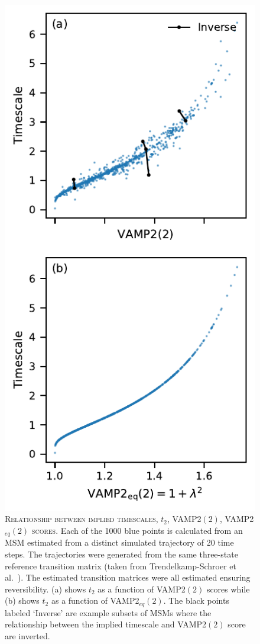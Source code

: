 \documentclass[journal=jacsat,manuscript=article]{achemso}
\begin{document}
\begin{figure}[ht]
    \centering
    \includegraphics{results2/timescale_vs_vamp_vs_evs.pdf}
    \caption{\textsc{Relationship between implied timescales, $t_2$, VAMP2$(2)$, VAMP2$_{eq}(2)$ scores}.  Each of the \num{1000} blue points is calculated from an MSM estimated from a distinct simulated trajectory of 20 time steps. The trajectories were generated from the same three-state reference transition matrix (taken from Trendelkamp-Schroer et al.~\cite{trendelkamp-schroer_estimation_2015}). The estimated transition matrices were all estimated ensuring reversibility. (a) shows $t_2$ as a function of VAMP2$(2)$ scores while (b) shows  $t_2$ as a function of VAMP2$_{eq}(2)$. The black points labeled `Inverse' are example subsets of MSMs where the relationship between the implied timescale and VAMP2$(2)$ score are inverted.}
    \label{fig:bad_vamps_examples}
\end{figure}
\end{document}
